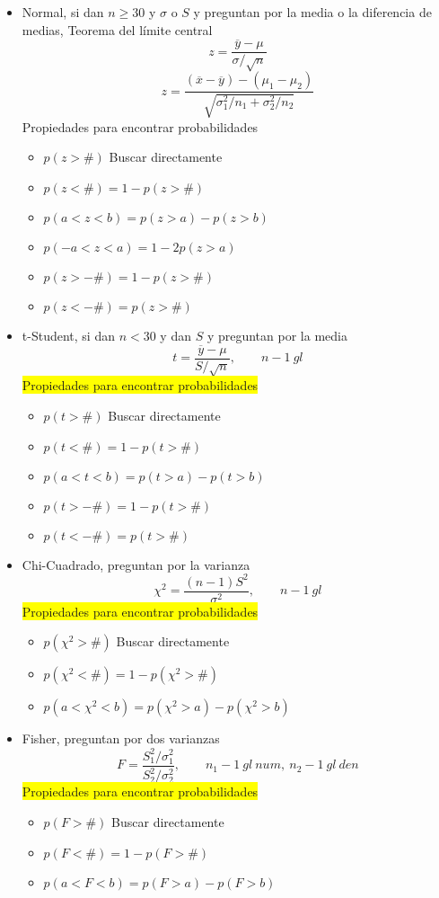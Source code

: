 \begin{itemize}
	\item Normal, si dan $n\geq30$ y $\sigma$ o $S$ y preguntan por la media o la diferencia de medias, Teorema del límite central
	$$z=\dfrac{\overline{y}-\mu}{\sigma/\sqrt{n}} $$
	$$z=\dfrac{(\overline{x}-\overline{y})-(\mu_1-\mu_2)}{\sqrt{\sigma_1^2/n_1+\sigma_2^2/n_2}} $$
	Propiedades para encontrar probabilidades
	\begin{itemize}
		\item $p(z>\#)$ Buscar directamente
		\item $p(z<\#)=1-p(z>\#)$
		\item $p(a<z<b)=p(z>a)-p(z>b)$
		\item $p(-a<z<a)=1-2p(z>a)$
		\item $p(z>-\#)=1-p(z>\#)$
		\item $p(z<-\#)=p(z>\#)$
	\end{itemize}
	\item t-Student, si dan $n<30$ y dan $S$ y preguntan por la media
	$$t=\dfrac{\overline{y}-\mu}{S/\sqrt{n}},\qquad n-1\ gl$$
	\colorbox{yellow}{Propiedades para encontrar probabilidades}
	
	\begin{itemize}
		\item $p(t>\#)$ Buscar directamente
		\item $p(t<\#)=1-p(t>\#)$
		\item $p(a<t<b)=p(t>a)-p(t>b)$
		\item $p(t>-\#)=1-p(t>\#)$
		\item $p(t<-\#)=p(t>\#)$
	\end{itemize}
	\item Chi-Cuadrado, preguntan por la varianza 
	$$\chi^2=\dfrac{(n-1)S^2}{\sigma^2},\qquad n-1\ gl$$
	\colorbox{yellow}{Propiedades para encontrar probabilidades}
	
	\begin{itemize}
		\item $p(\chi^2>\#)$ Buscar directamente
		\item $p(\chi^2<\#)=1-p(\chi^2>\#)$
		\item $p(a<\chi^2<b)=p(\chi^2>a)-p(\chi^2>b)$
	\end{itemize}
	\item Fisher, preguntan por dos varianzas
	$$F=\dfrac{S_1^2/\sigma_1^2}{S_2^2/\sigma_2^2},\qquad n_1-1\  gl\ num,\ n_2-1\  gl\ den$$
	\colorbox{yellow}{Propiedades para encontrar probabilidades}
	
	\begin{itemize}
		\item $p(F>\#)$ Buscar directamente
		\item $p(F<\#)=1-p(F>\#)$
		\item $p(a<F<b)=p(F>a)-p(F>b)$
	\end{itemize}
\end{itemize}

